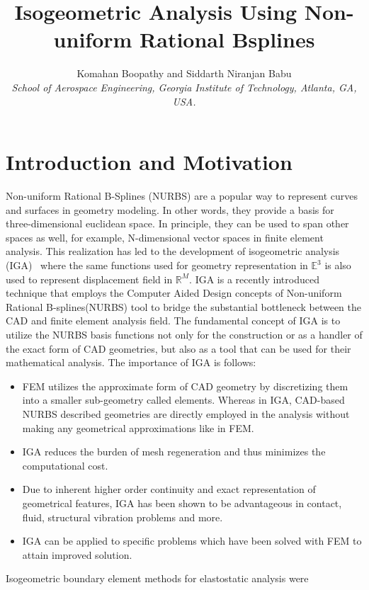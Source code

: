 \documentclass[submit,12pt]{aiaa-pretty} %
\title{Isogeometric Analysis Using Non-uniform Rational Bsplines}
\author{Komahan Boopathy  and Siddarth Niranjan Babu\\
  {\normalsize\itshape School of Aerospace Engineering, Georgia Institute of Technology,
    Atlanta, GA, USA. } %
}
\begin{document}
\maketitle

    
\section{Introduction and Motivation}

Non-uniform Rational B-Splines (NURBS) \cite{Piegl:NurbsBook} are a
popular way to represent curves and surfaces in geometry modeling. In
other words, they provide a basis for three-dimensional euclidean
space. In principle, they can be used to span other spaces as well,
for example, N-dimensional vector spaces in finite element
analysis. This realization has led to the development of isogeometric
analysis
(IGA)~\cite{HUGHES20054135,KACPRZYK201487,NGUYEN201589,Agrawal2018,Milic2013,Simpson}
where the same functions used for geometry representation in
$\mathbb{E}^3$ is also used to represent displacement field in
$\mathbb{R}^M$.
IGA is a recently introduced technique that employs the Computer Aided
Design concepts of Non-uniform Rational B-splines(NURBS) tool to
bridge the substantial bottleneck between the CAD and finite element
analysis field. The fundamental concept of IGA is to utilize the NURBS
basis functions not only for the construction or as a handler of the
exact form of CAD geometries, but also as a tool that can be used for
their mathematical analysis.
The importance of IGA is follows:
\begin{itemize}
  \item FEM utilizes the approximate form of CAD geometry by discretizing them into a smaller sub-geometry called elements. Whereas in IGA, CAD-based NURBS described geometries are directly employed in the analysis without making any geometrical approximations like in FEM.
  \item IGA reduces the burden of mesh regeneration and thus minimizes the computational cost. %
  \item Due to inherent higher order continuity and exact representation of geometrical features, IGA has been shown to be advantageous in contact, fluid, structural vibration problems and more. 
  \item IGA can be applied to specific problems which have been solved with FEM to attain improved solution.
\end{itemize}
Isogeometric boundary element methods for elastostatic analysis were
\end{document}
